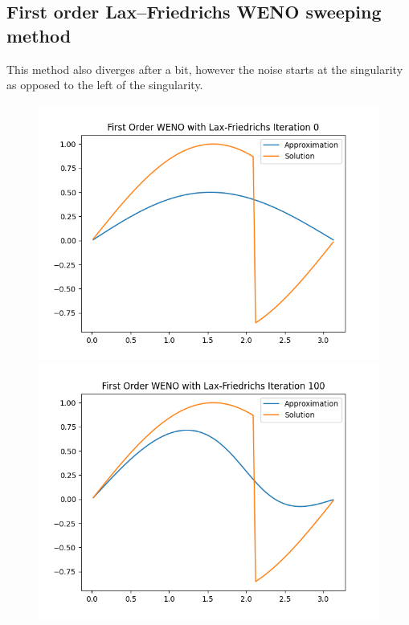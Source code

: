 \documentclass{article}
\begin{document}
\subsection{First order Lax–Friedrichs WENO sweeping method}
This method also diverges after a bit, however the noise starts at the singularity as opposed to the left of the singularity.
\begin{figure}[t!]
    \centering
    \begin{minipage}{.48\textwidth}
        \centering
        \includegraphics[width=0.9\linewidth]{imgs/output_weno1_lf/plot_0.png}
    \end{minipage}%
    \begin{minipage}{.48\textwidth}
        \centering
        \includegraphics[width=0.9\linewidth]{imgs/output_weno1_lf/plot_100.png}

\end{minipage}
\end{figure}
\end{document}

